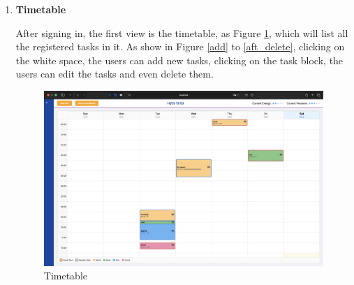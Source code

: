 \documentclass[12pt, a4paper]{article}
\begin{document}
\begin{enumerate}
                \item \textbf{Timetable} 

                    After signing in, the first view is the timetable, as Figure \ref{timetable}, which will list all the registered tasks in it. As show in Figure \ref{add} to \ref{aft_delete}, clicking on the white space, the users can add new tasks, clicking on the task block, the users can edit the tasks and even delete them. 

                    \begin{figure}[H]
                        \centering
                        \includegraphics[width=\textwidth]{Images/System/timetable/timetable.png}
                        \caption{Timetable}
                        \label{timetable}
                    \end{figure}


\end{enumerate}
\end{document}
